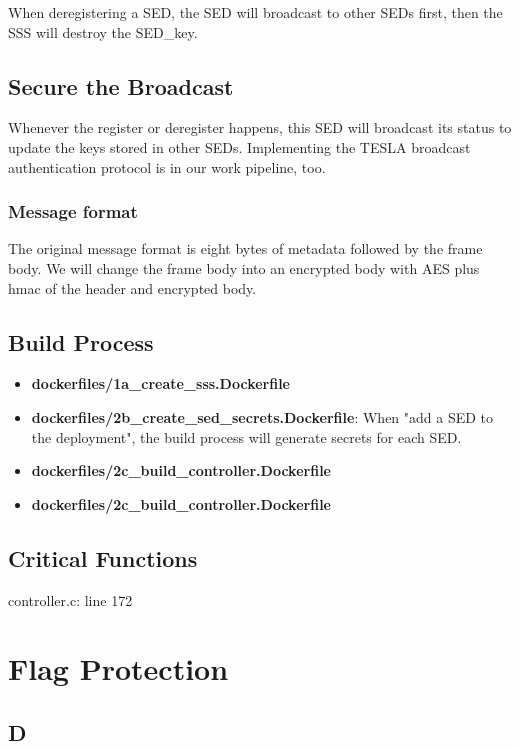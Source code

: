 \documentclass[11pt,oneside,onecolumn,letterpaper]{article}
\begin{document}
When deregistering a SED, the SED will broadcast to other SEDs first, then the SSS will destroy the SED\_key.

\subsection{Secure the Broadcast}
Whenever the register or deregister happens, this SED will broadcast its status to update the keys stored in other SEDs.
Implementing the TESLA broadcast authentication protocol is in our work pipeline, too.

\subsubsection{Message format}
The original message format is eight bytes of metadata followed by the frame body.
We will change the frame body into an encrypted body with AES plus hmac of the header and encrypted body.


\subsection{Build Process}

  \begin{itemize}
    \item \textbf{dockerfiles/1a\_create\_sss.Dockerfile}
    \item \textbf{dockerfiles/2b\_create\_sed\_secrets.Dockerfile}: When "add a SED to the deployment", the build process will generate secrets for each SED.
    \item \textbf{dockerfiles/2c\_build\_controller.Dockerfile}
    \item \textbf{dockerfiles/2c\_build\_controller.Dockerfile}
  \end{itemize}

\subsection{Critical Functions}
controller.c: line 172


\section{Flag Protection}

\subsection{\textsf{D}}
\end{document}
